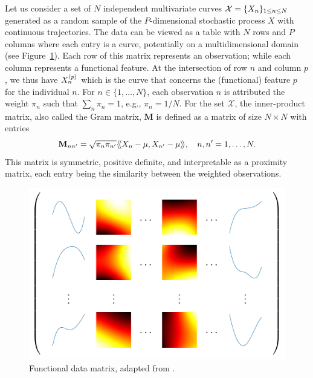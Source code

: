 Let us consider a set of $N$ independent multivariate curves $\mathcal{X} = \{X_n\}_{1 \leq n \leq N}$ generated as a random sample of the $P$-dimensional stochastic process $X$ with continuous trajectories. The data can be viewed as a table with $N$ rows and $P$ columns where each entry is a curve, potentially on a multidimensional domain (see Figure~\ref{fig:data_matrix}). Each row of this matrix represents an observation; while each column represents a functional feature. At the intersection of row $n$ and column $p$, we thus have $X_n^{(p)}$ which is the curve that concerns the (functional) feature $p$ for the individual $n$. For $n \in \{1, \dots, N\}$, each observation $n$ is attributed the weight $\pi_n$ such that $\sum_n \pi_n = 1$, e.g., $\pi_n = 1/N$. For the set $\mathcal{X}$, the inner-product matrix, also called the Gram matrix, $\mathbf{M}$ is defined as a matrix of size $N \times N$ with entries
\begin{equation}\label{eq:gram_mat}
    \mathbf{M}_{nn^\prime} = \sqrt{\pi_n \pi_{n^{\prime}}}\langle\!\langle X_n - \mu, X_{n^\prime} - \mu\rangle\!\rangle, \quad n, n^\prime = 1, \dots, N.
\end{equation}
This matrix is symmetric, positive definite, and interpretable as a proximity matrix, each entry being the similarity between the weighted observations.

\begin{figure}
    \centering
    \includegraphics[scale=0.9]{figures/data_matrix.pdf}
    \caption{Functional data matrix, adapted from \cite{berrenderoPrincipalComponentsMultivariate2011}.}
    \label{fig:data_matrix}
\end{figure}

